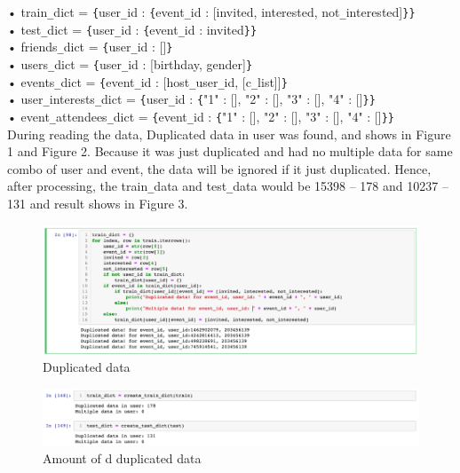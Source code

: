 \documentclass{article}
\begin{document}
•	train\verb+_+dict = \verb+{+user\verb+_+id : \verb+{+event\verb+_+id : [invited, interested, not\verb+_+interested]\verb+}+\verb+}+\\
•	test\verb+_+dict = \verb+{+user\verb+_+id : \verb+{+event\verb+_+id : invited\verb+}+\verb+}+\\
•	friends\verb+_+dict = \verb+{+user\verb+_+id : []\verb+}+\\
•	users\verb+_+dict = \verb+{+user\verb+_+id : [birthday, gender]\verb+}+\\
•	events\verb+_+dict = \verb+{+event\verb+_+id : [host\verb+_+user\verb+_+id, [c\verb+_+list]]\verb+}+\\
•	user\verb+_+interests\verb+_+dict = \verb+{+user\verb+_+id : \verb+{+"1" : [], "2" : [], "3" : [], "4" : []\verb+}+\verb+}+\\
•	event\verb+_+attendees\verb+_+dict = \verb+{+event\verb+_+id : \verb+{+"1" : [], "2" : [], "3" : [], "4" : []\verb+}+\verb+}+\\

During reading the data, Duplicated data in user was found, and shows in Figure 1 and Figure 2. Because it was just duplicated and had no multiple data for same combo of user and event, the data will be ignored if it just duplicated. Hence, after processing, the train\verb+_+data and test\verb+_+data would be 15398 – 178 and 10237 – 131 and result shows in Figure 3.

\begin{figure}[H]
  \centering
  \includegraphics[width=1.0\textwidth]{img/Picture 2}
  \caption{Duplicated data}
\end{figure}

\begin{figure}[H]
  \centering
  \includegraphics[width=1.0\textwidth]{img/Picture 1}
  \caption{Amount of d duplicated data}
\end{figure}
\end{document}
